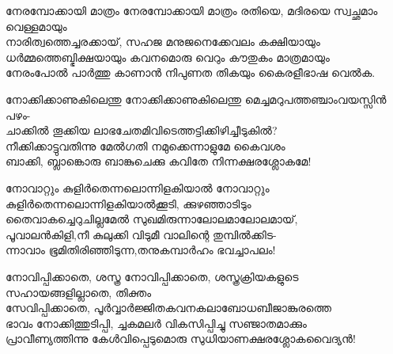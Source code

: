\begin{enumerate}

\begin{slokam}{\VSr}{\RV}{നേരമ്പോക്കായി മാത്രം}
നേരമ്പോക്കായി മാത്രം രതിയെ, മദിരയെ സ്വച്ഛമാം വെള്ളമായും\\
നാരിത്വത്തെച്ചരക്കായ്‌, സഹജ മനുജനെക്കേവലം കക്ഷിയായും\\
ധർമ്മത്തെബ്ഭിക്ഷയായും കവനമൊരു വെറും കൗതുകം മാത്രമായും\\
നേരംപോൽ പാർത്തു കാണാൻ നിപുണത തികയും കൈരളീഭാഷ വെൽക.
\end{slokam}


\begin{slokam}{\VSv}{\NDK}{നോക്കിക്കാണുകിലെന്തു}
നോക്കിക്കാണുകിലെന്തു മെച്ചമറുപത്തഞ്ചാംവയസ്സിൻ പഴം-\\
ചാക്കിൽ തൂക്കിയ ലാഭചേതമിവിടെത്തട്ടിക്കിഴിച്ചീടുകിൽ?\\
നീക്കിക്കാട്ടുവതിന്നു മേൽഗതി നമുക്കെന്നാളുമേ കൈവശം\\
ബാക്കി, ബ്ലാങ്കൊരു ബാങ്കുചെക്കു കവിതേ നിന്നക്ഷരശ്ലോകമേ!
\end{slokam}


\begin{slokam}{\VSv}{\KND}{നോവാറ്റും കുളിർതെന്നലൊന്നിളകിയാൽ}
നോവാറ്റും കുളിർതെന്നലൊന്നിളകിയാൽക്കൂടി, ക്കുഴഞ്ഞാടിടും\\
തൈവാകച്ചെറുചില്ലമേൽ സുഖമിരുന്നാലോലമാലോലമായ്,\\
പൂവാലൻകിളി,നീ കുലുക്കി വിടുമീ വാലിന്റെ തുമ്പിൽക്കിട-\\
ന്നാവാം ഭൂമിതിരിഞ്ഞിടുന്ന,തനുകമ്പാർഹം ഭവച്ചാപലം!
\end{slokam}



\begin{slokam}{\VSr}{\VKG}{നോവിപ്പിക്കാതെ, ശസ്ത്ര}
നോവിപ്പിക്കാതെ, ശസ്ത്രക്രിയകളുടെ സഹായങ്ങളില്ലാതെ, തിക്തം\\
സേവിപ്പിക്കാതെ, പൂർവ്വാർജ്ജിതകവനകലാബോധബീജാങ്കുരത്തെ\\
ഭാവം നോക്കിത്തുടിപ്പി, ച്ചകമലർ വികസിപ്പിച്ചു സഞ്ജാതമാക്കും\\
പ്രാവീണ്യത്തിന്നു കേള്‍വിപ്പെടുമൊരു സുധിയാണക്ഷരശ്ലോകവൈദ്യൻ!
\end{slokam}



\end{enumerate}
